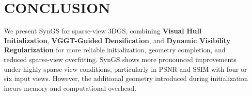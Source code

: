 \section{CONCLUSION}
\label{sec:conclusion}

We present SynGS for sparse-view 3DGS, combining \textbf{Visual Hull Initialization}, \textbf{VGGT-Guided Densification}, and \textbf{Dynamic Visibility Regularization} for more reliable initialization, geometry completion, and reduced sparse-view overfitting.
SynGS shows more pronounced improvements under highly sparse-view conditions, particularly in PSNR and SSIM with four or six input views.  However, the additional geometry introduced during initialization incurs memory and computational overhead. 
